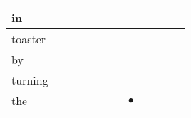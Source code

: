 \documentclass[landscape]{article}
\newcommand{\ssp}{\hspace{2pt}}
\newcommand{\mex}{\cellcolor{g}$\bullet$}
\begin{document}
\begin{tabular}{|l|p{10pt}|p{10pt}|p{10pt}|p{10pt}|p{10pt}|p{10pt}|p{10pt}|p{10pt}|p{10pt}|p{10pt}|p{10pt}|}
\hline
\ssp in \ssp&\hspace{2pt}&\hspace{2pt}&\hspace{2pt}&\hspace{2pt}&\hspace{2pt}&\hspace{2pt}&\hspace{2pt}&\hspace{2pt}&\hspace{2pt}&\hspace{2pt}&\hspace{2pt}\\
\hline
\ssp toaster \ssp&\hspace{2pt}&\hspace{2pt}&\hspace{2pt}&\hspace{2pt}&\hspace{2pt}&\hspace{2pt}&\hspace{2pt}&\hspace{2pt}&\hspace{2pt}&\hspace{2pt}&\hspace{2pt}\\
\hline
\ssp by \ssp&\hspace{2pt}&\hspace{2pt}&\hspace{2pt}&\hspace{2pt}&\hspace{2pt}&\hspace{2pt}&\hspace{2pt}&\hspace{2pt}&\hspace{2pt}&\hspace{2pt}&\hspace{2pt}\\
\hline
\ssp turning \ssp&\hspace{2pt}&\hspace{2pt}&\hspace{2pt}&\hspace{2pt}&\hspace{2pt}&\hspace{2pt}&\hspace{2pt}&\hspace{2pt}&\hspace{2pt}&\hspace{2pt}&\hspace{2pt}\\
\hline
\ssp \cellcolor{ref6}the \ssp&\hspace{2pt}&\hspace{2pt}&\hspace{2pt}&\hspace{2pt}&\hspace{2pt}&\hspace{2pt}&\hspace{2pt}\mex&\hspace{2pt}&\hspace{2pt}&\hspace{2pt}&\hspace{2pt}\\

\end{tabular}
\end{document}
